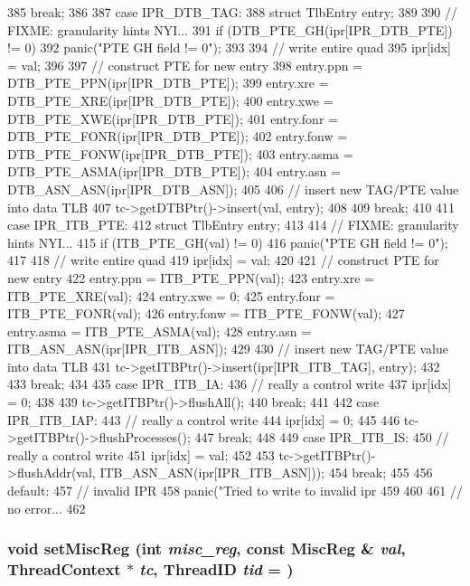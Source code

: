 \begin{DoxyCode}
{{385         break;
386 
387       case IPR_DTB_TAG: {
388           struct TlbEntry entry;
389 
390           // FIXME: granularity hints NYI...
391           if (DTB_PTE_GH(ipr[IPR_DTB_PTE]) != 0)
392               panic("PTE GH field != 0");
393 
394           // write entire quad
395           ipr[idx] = val;
396 
397           // construct PTE for new entry
398           entry.ppn = DTB_PTE_PPN(ipr[IPR_DTB_PTE]);
399           entry.xre = DTB_PTE_XRE(ipr[IPR_DTB_PTE]);
400           entry.xwe = DTB_PTE_XWE(ipr[IPR_DTB_PTE]);
401           entry.fonr = DTB_PTE_FONR(ipr[IPR_DTB_PTE]);
402           entry.fonw = DTB_PTE_FONW(ipr[IPR_DTB_PTE]);
403           entry.asma = DTB_PTE_ASMA(ipr[IPR_DTB_PTE]);
404           entry.asn = DTB_ASN_ASN(ipr[IPR_DTB_ASN]);
405 
406           // insert new TAG/PTE value into data TLB
407           tc->getDTBPtr()->insert(val, entry);
408       }
409         break;
410 
411       case IPR_ITB_PTE: {
412           struct TlbEntry entry;
413 
414           // FIXME: granularity hints NYI...
415           if (ITB_PTE_GH(val) != 0)
416               panic("PTE GH field != 0");
417 
418           // write entire quad
419           ipr[idx] = val;
420 
421           // construct PTE for new entry
422           entry.ppn = ITB_PTE_PPN(val);
423           entry.xre = ITB_PTE_XRE(val);
424           entry.xwe = 0;
425           entry.fonr = ITB_PTE_FONR(val);
426           entry.fonw = ITB_PTE_FONW(val);
427           entry.asma = ITB_PTE_ASMA(val);
428           entry.asn = ITB_ASN_ASN(ipr[IPR_ITB_ASN]);
429 
430           // insert new TAG/PTE value into data TLB
431           tc->getITBPtr()->insert(ipr[IPR_ITB_TAG], entry);
432       }
433         break;
434 
435       case IPR_ITB_IA:
436         // really a control write
437         ipr[idx] = 0;
438 
439         tc->getITBPtr()->flushAll();
440         break;
441 
442       case IPR_ITB_IAP:
443         // really a control write
444         ipr[idx] = 0;
445 
446         tc->getITBPtr()->flushProcesses();
447         break;
448 
449       case IPR_ITB_IS:
450         // really a control write
451         ipr[idx] = val;
452 
453         tc->getITBPtr()->flushAddr(val, ITB_ASN_ASN(ipr[IPR_ITB_ASN]));
454         break;
455 
456       default:
457         // invalid IPR
458         panic("Tried to write to invalid ipr %
459     }
460 
461     // no error...
462 }
\end{DoxyCode}
\hypertarget{classAlphaISA_1_1ISA_ab85b054f14d72781b7f540270867e2df}{
\subsubsection[{setMiscReg}]{\setlength{\rightskip}{0pt plus 5cm}void setMiscReg (int {\em misc\_\-reg}, \/  const {\bf MiscReg} \& {\em val}, \/  {\bf ThreadContext} $\ast$ {\em tc}, \/  {\bf ThreadID} {\em tid} = {})}}
\label{classAlphaISA_1_1ISA_ab85b054f14d72781b7f540270867e2df}



